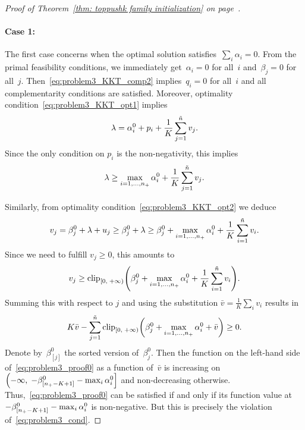 \begin{proof}[Proof of Theorem~\ref{thm: toppushk family initialization} on page~\pageref{thm: toppushk family initialization}]
  \paragraph*{Case 1:} The first case concerns when the optimal solution satisfies~$\sum_i  \alpha_i = 0$. From the primal feasibility conditions, we immediately get~$\alpha_i = 0$ for all~$i$ and~$\beta_j = 0$ for all~$j$. Then~\eqref{eq:problem3_KKT_comp2} implies~$q_i = 0$ for all~$i$ and all complementarity conditions are satisfied. Moreover, optimality condition~\eqref{eq:problem3_KKT_opt1} implies
  \begin{equation*}
    \lambda = \alpha_i^0 + p_i + \frac{1}{K} \sum_{j = 1}^{\tilde{n}} v_j.
  \end{equation*}
  Since the only condition on $p_i$ is the non-negativity, this implies
  \begin{equation*}
    \lambda \ge \max_{i=1, \ldots, n_{+}} \alpha_i^0 + \frac{1}{K} \sum_{j = 1}^{\tilde{n}} v_j.
  \end{equation*}

  Similarly, from optimality condition~\eqref{eq:problem3_KKT_opt2} we deduce
  \begin{equation*}
    v_j
      = \beta_j^0 + \lambda + u_j
      \ge \beta_j^0 + \lambda
      \ge \beta_j^0 + \max_{i=1,\dots,n_{+}} \alpha_i^0 + \frac{1}{K} \sum_{i = 1}^{\tilde{n}} v_i.
  \end{equation*}
  Since we need to fulfill $v_j \ge 0$, this amounts to
  \begin{equation*}
    v_j 
      \ge \clip[u]{0}{+\infty}{\beta_j^0 + \max_{i=1,\dots,\npos} \alpha_i^0 + \frac{1}{K} \sum_{i = 1}^{\ntil} v_i}.
  \end{equation*}
  Summing this with respect to $j$ and using the substitution $\bar{v} = \frac{1}{K}\sum_i v_i$ results in
  \begin{equation}\label{eq:problem3_proof0}
    K\bar{v} - \sum_{j=1}^{\ntil} \clip[u]{0}{+\infty}{\beta_j^0 + \max_{i=1,\dots,\npos} \alpha_i^0 + \bar{v}} \geq 0.
  \end{equation}
  Denote by~$\beta_{[j]}^0$ the sorted version of~$\beta_j^0$. Then the function on the left-hand side of~\eqref{eq:problem3_proof0} as a function of~$\bar{v}$ is increasing on~$\left(-\infty, \; -\beta_{[\npos - K + 1]}^0 - \max_{i} \alpha_i^0 \right]$ and non-decreasing otherwise. Thus,~\eqref{eq:problem3_proof0} can be satisfied if and only if its function value at~$- \beta_{[n_{+} - K + 1]}^0 - \max_{i} \alpha_i^0$ is non-negative. But this is precisely the violation of~\eqref{eq:problem3_cond}.
  

\end{proof}
